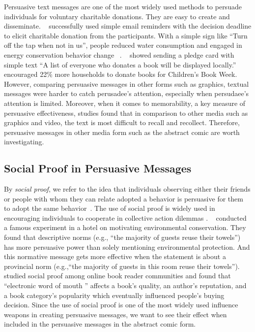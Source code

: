 Persuasive text messages are one of the most widely used methods to persuade individuals for voluntary charitable donations. They are easy to create and disseminate. ~\textcite{damgaard2017now} successfully used simple email reminders with the decision deadline to elicit charitable donation from the participants. With a simple sign like ``Turn off the tap when not in us'', people reduced water consumption and engaged in energy conservation behavior change ~\cite{mckenzie2011fostering}. ~\textcite{cotterill2010impact} showed sending a pledge card with simple text ``A list of everyone who donates a book will be displayed locally.'' encouraged 22\% more households to donate books for Children's Book Week. However, comparing persuasive messages in other forms such as graphics, textual messages were harder to catch perusadee's attention, especially when persudaee's attention is limited. Moreover, when it comes to memorability, a key measure of persuasive effectiveness, studies found that in comparison to other media such as graphics and video, the text is most difficult to recall and recollect. Therefore, persuasive messages in other media form such as the abstract comic are worth investigating. 


\subsection{Social Proof in Persuasive Messages }
By \textit{social proof}, we refer to the idea that individuals observing either their friends or people with whom they can relate adopted a behavior is persuasive for them to adopt the same behavior~\cite{Cialdini1993, Cialdini2004}. The use of social proof is widely used in encouraging individuals to cooperate in collective action dilemmas \cite{goldstein2008room,schultz2007constructive}. ~\textcite{goldstein2008room} conducted a famous experiment in a hotel on motivating environmental conservation. They found that descriptive norms (e.g., ``the majority of guests reuse their towels'') has more persuasive power than solely mentioning environmental protection. And this normative message gets more effective when the statement is about a provincial norm (e.g.,``the majority of guests in this room reuse their towels''). \textcite{amblee2011harnessing} studied social proof among online book reader communities and found that 
``electronic word of mouth '' affects a book's quality, an author's reputation, and a book category's popularity which eventually influenced people's buying decision. Since the use of social proof is one of the most widely used influence weapons in creating persuasive messages, we want to see their effect when included in the persuasive messages in the abstract comic form. 



